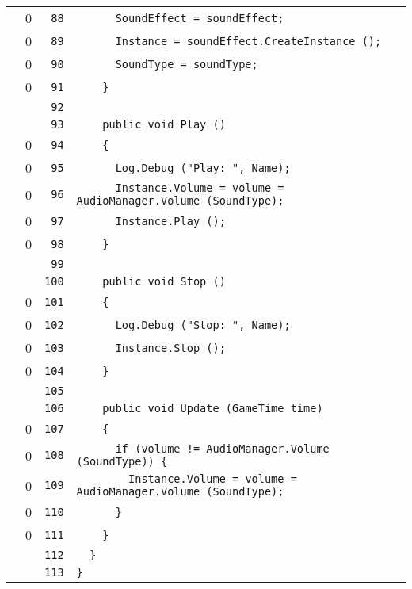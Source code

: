 \documentclass[a4paper,10pt]{article}
\begin{document}
\begin{longtable}[l]{lrrl}
\cellcolor{red} & 0 & \verb~88~ & \verb~      SoundEffect = soundEffect;~\\
\cellcolor{red} & 0 & \verb~89~ & \verb~      Instance = soundEffect.CreateInstance ();~\\
\cellcolor{red} & 0 & \verb~90~ & \verb~      SoundType = soundType;~\\
\cellcolor{red} & 0 & \verb~91~ & \verb~    }~\\
\cellcolor{gray} &  & \verb~92~ & \verb~~\\
\cellcolor{gray} &  & \verb~93~ & \verb~    public void Play ()~\\
\cellcolor{red} & 0 & \verb~94~ & \verb~    {~\\
\cellcolor{red} & 0 & \verb~95~ & \verb~      Log.Debug ("Play: ", Name);~\\
\cellcolor{red} & 0 & \verb~96~ & \verb~      Instance.Volume = volume = AudioManager.Volume (SoundType);~\\
\cellcolor{red} & 0 & \verb~97~ & \verb~      Instance.Play ();~\\
\cellcolor{red} & 0 & \verb~98~ & \verb~    }~\\
\cellcolor{gray} &  & \verb~99~ & \verb~~\\
\cellcolor{gray} &  & \verb~100~ & \verb~    public void Stop ()~\\
\cellcolor{red} & 0 & \verb~101~ & \verb~    {~\\
\cellcolor{red} & 0 & \verb~102~ & \verb~      Log.Debug ("Stop: ", Name);~\\
\cellcolor{red} & 0 & \verb~103~ & \verb~      Instance.Stop ();~\\
\cellcolor{red} & 0 & \verb~104~ & \verb~    }~\\
\cellcolor{gray} &  & \verb~105~ & \verb~~\\
\cellcolor{gray} &  & \verb~106~ & \verb~    public void Update (GameTime time)~\\
\cellcolor{red} & 0 & \verb~107~ & \verb~    {~\\
\cellcolor{red} & 0 & \verb~108~ & \verb~      if (volume != AudioManager.Volume (SoundType)) {~\\
\cellcolor{red} & 0 & \verb~109~ & \verb~        Instance.Volume = volume = AudioManager.Volume (SoundType);~\\
\cellcolor{red} & 0 & \verb~110~ & \verb~      }~\\
\cellcolor{red} & 0 & \verb~111~ & \verb~    }~\\
\cellcolor{gray} &  & \verb~112~ & \verb~  }~\\
\cellcolor{gray} &  & \verb~113~ & \verb~}~\\
\end{longtable}
\newpage
\end{document}
